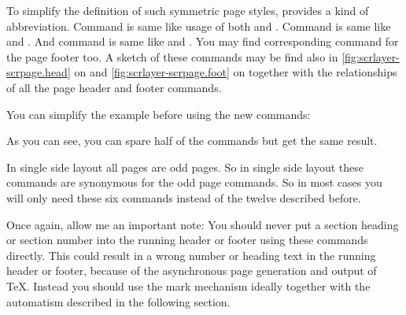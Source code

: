 To simplify the definition of such symmetric page styles,
 provides a kind of abbreviation. Command
 is same like usage of both  and
. Command  is same like  and
. And command  is same like  and
. You may find corresponding command for the page footer too. A
sketch of these commands may be find also in
\autoref{fig:scrlayer-scrpage.head} on 
and \autoref{fig:scrlayer-scrpage.foot} on
 together with the relationships of all
the page header and footer commands.
%
\begin{Example}
  You can simplify the example before using the new commands:
  As you can see, you can spare half of the commands but get the same result.
\end{Example}
%
In single side layout all pages are odd pages. So in single side layout these
commands are synonymous for the odd page commands. So in most cases you will
only need these six commands instead of the twelve described before.

Once again, allow me an important note: You should never
put a section heading or section number into the running header or footer
using these commands directly. This could result in a wrong number or heading
text in the running header or footer, because of the asynchronous page
generation and output of \TeX. Instead you should use the mark mechanism
ideally together with the automatism described in the following section.%
%
%
%
%
%
%


\begin{Declaration}
\end{Declaration}
%
%
%
%
%
%
%
%
%
%

